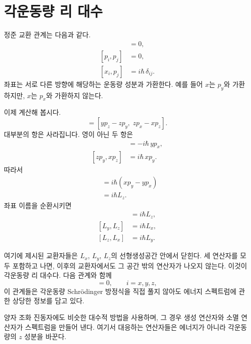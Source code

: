 \section{각운동량 리 대수}

정준 교환 관계는 다음과 같다.
\begin{align}
[x_i,x_j]&=0,\\
[p_i,p_j]&=0,\\
[x_i,p_j]&=i\hbar\,\delta_{ij}.
\end{align}
좌표는 서로 다른 방향에 해당하는 운동량 성분과 가환한다. 예를 들어 \(x\)는 \(p_y\)와 가환하지만, \(x\)는 \(p_x\)와 가환하지 않는다.

이제 계산해 봅시다.
\begin{equation}
[L_x,L_y]
=
[yp_z-zp_y,\;zp_x-xp_z].
\end{equation}
대부분의 항은 사라집니다. 영이 아닌 두 항은
\begin{align}
[yp_z,zp_x]&=-i\hbar\,yp_x,\\
[zp_y,xp_z]&=i\hbar\,xp_y.
\end{align}
따라서
\begin{align}
[L_x,L_y]
&=i\hbar\left(xp_y-yp_x\right)\\
&=i\hbar L_z.
\end{align}
좌표 이름을 순환시키면
\begin{align}
[L_x,L_y]&=i\hbar L_z,\\
[L_y,L_z]&=i\hbar L_x,\\
[L_z,L_x]&=i\hbar L_y.
\end{align}

\begin{classroomqa}
\end{classroomqa}

여기에 제시된 교환자들은 \(L_x\), \(L_y\), \(L_z\)의 선형생성공간 안에서 닫힌다. 세 연산자를 모두 포함하고 나면, 이후의 교환자에서도 그 공간 밖의 연산자가 나오지 않는다. 이것이 각운동량 리 대수다. 다음 관계와 함께
\begin{equation}
[H,L_i]=0,
\qquad i=x,y,z,
\end{equation}
이 관계들은 각운동량 Schr\"odinger 방정식을 직접 풀지 않아도 에너지 스펙트럼에 관한 상당한 정보를 담고 있다.

양자 조화 진동자에도 비슷한 대수적 방법을 사용하며, 그 경우 생성 연산자와 소멸 연산자가 스펙트럼을 만들어 낸다. 여기서 대응하는 연산자들은 에너지가 아니라 각운동량의 \(z\) 성분을 바꾼다.

